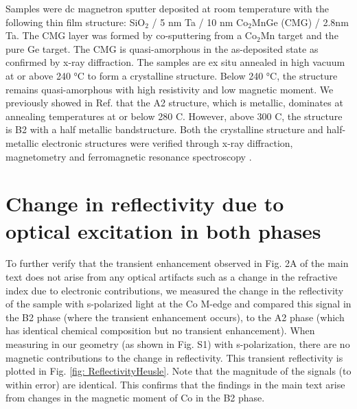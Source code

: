 Samples were dc magnetron sputter deposited at room temperature with the following thin film structure: SiO$_2$ / 5 nm Ta / 10 nm Co$_2$MnGe (CMG) / 2.8nm Ta. The CMG layer was formed by co-sputtering from a Co$_2$Mn target and the pure Ge target. The CMG is quasi-amorphous in the as-deposited state as confirmed by x-ray diffraction.  The samples are ex situ annealed in high vacuum at or above 240 °C to form a crystalline structure. Below 240 °C, the structure remains quasi-amorphous with high resistivity and low magnetic moment. We previously showed in Ref. \cite{Shaw2018} that the A2 structure, which is metallic, dominates at annealing temperatures at or below 280 C. However, above 300 C, the structure is B2 with a half metallic bandstructure.  Both the crystalline structure and half-metallic electronic structures were verified through x-ray diffraction, magnetometry and ferromagnetic resonance spectroscopy \cite{Shaw2018}.

\section{Change in reflectivity due to optical excitation in both phases} 
To further verify that the transient enhancement observed in Fig. 2A of the main text does not arise from any optical artifacts such as a change in the refractive index due to electronic contributions, we measured the change in the reflectivity of the sample with s-polarized light at the Co M-edge and compared this signal in the B2 phase (where the transient enhancement occurs), to the A2 phase (which has identical chemical composition but no transient enhancement). When measuring in our geometry (as shown in Fig. S1) with s-polarization, there are no magnetic contributions to the change in reflectivity. This transient reflectivity is plotted in Fig. \ref{fig: ReflectivityHeusle}. Note that the magnitude of the signals (to within error) are identical. This confirms that the findings in the main text arise from changes in the magnetic moment of Co in the B2 phase.

